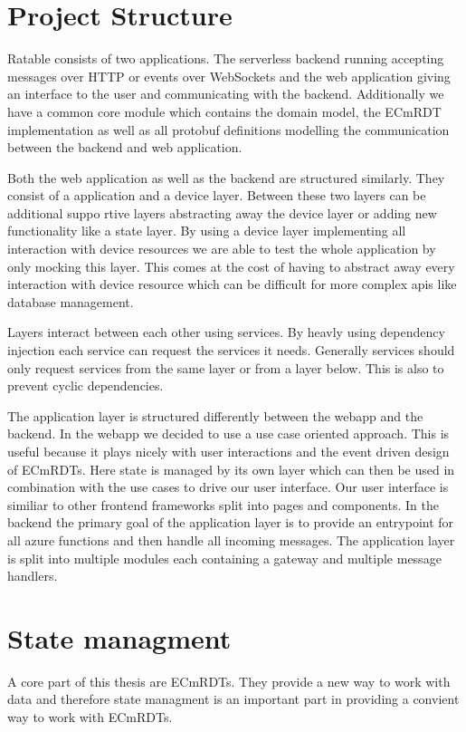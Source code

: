 \documentclass[
	ngerman,
	ruledheaders=section,   %
	class=report,		    %
	thesis={type=bachelor}, %
	accentcolor=9c,			%
	custommargins=true,    %
	marginpar=false,        %
	parskip=half-,          %
	fontsize=11pt,          %
]{tudapub}
\begin{document}
\section{Project Structure}
Ratable consists of two applications. The serverless backend running accepting messages over HTTP or events over WebSockets and the web application giving an interface to the user and communicating with the backend. Additionally we have a common core module which contains the domain model, the ECmRDT implementation as well as all protobuf definitions modelling the communication between the backend and web application.

Both the web application as well as the backend are structured similarly. They consist of a application and a device layer. Between these two layers can be additional suppo
rtive layers abstracting away the device layer or adding new functionality like a state layer. By using a device layer implementing all interaction with device resources we are able to test the whole application by only mocking this layer. This comes at the cost of having to abstract away every interaction with device resource which can be difficult for more complex apis like database management. 

Layers interact between each other using services. By heavly using dependency injection each service can request the services it needs. Generally services should only request services from the same layer or from a layer below. This is also to prevent cyclic dependencies. 

The application layer is structured differently between the webapp and the backend. In the webapp we decided to use a use case oriented approach. This is useful because it plays nicely with user interactions and the event driven design of ECmRDTs. Here state is managed by its own layer which can then be used in combination with the use cases to drive our user interface. Our user interface is similiar to other frontend frameworks split into pages and components. In the backend the primary goal of the application layer is to provide an entrypoint for all azure functions and then handle all incoming messages. The application layer is split into multiple modules each containing a gateway and multiple message handlers.

\section{State managment}
A core part of this thesis are ECmRDTs. They provide a new way to work with data and therefore state managment is an important part in providing a convient way to work with ECmRDTs. 
\end{document}

